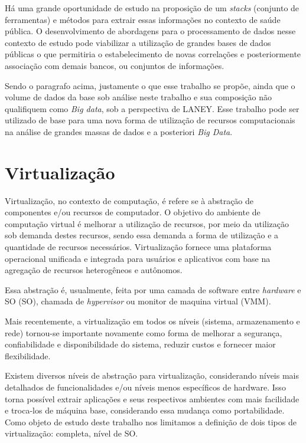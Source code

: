 Há uma grande oportunidade de estudo na proposição de um \emph{stacks} (conjunto de ferramentas) e métodos para extrair essas informações no contexto de saúde pública. O desenvolvimento de abordagens para o processamento de dados nesse contexto de estudo pode viabilizar a utilização de grandes bases de dados públicas o que permitiria o estabelecimento de novas correlações e posteriormente associação com demais bancos, ou conjuntos de informações.

Sendo o paragrafo acima, justamente o que esse trabalho se propõe, ainda que o volume de dados da base sob análise neste trabalho e sua composição não qualifiquem como \emph{Big data}, sob a perspectiva de LANEY. Esse trabalho pode ser utilizado de base para uma nova forma de utilização de recursos computacionais na análise de grandes massas de dados e a posteriori \emph{Big Data}. 

\section{Virtualização}
Virtualização, no contexto de computação, é refere se à abstração de componentes e/ou recursos de computador. O objetivo do ambiente de computação virtual é melhorar a utilização de recursos, por meio da utilização sob demanda destes recursos, sendo essa demanda a forma de utilização e a quantidade de recursos necessários. Virtualização fornece uma plataforma operacional unificada e integrada para usuários e aplicativos com base na agregação de recursos heterogêneos e autônomos.

Essa abstração é, usualmente, feita por uma camada de software entre \emph{hardware} e SO (SO), chamada de \emph{hypervisor} ou monitor de maquina virtual (VMM).

Mais recentemente, a virtualização em todos os níveis (sistema, armazenamento e rede) tornou-se importante novamente como forma de melhorar a segurança, confiabilidade e disponibilidade do sistema, reduzir custos e fornecer maior flexibilidade.\cite{virt}

Existem diversos níveis de abstração para virtualização, considerando níveis mais detalhados de funcionalidades e/ou níveis menos específicos de hardware. Isso torna possível extrair aplicações e seus respectivos ambientes com mais facilidade e troca-los de máquina base, considerando essa mudança como portabilidade. Como objeto de estudo deste trabalho nos limitamos a definição de dois tipos de virtualização: completa, nível de SO.

